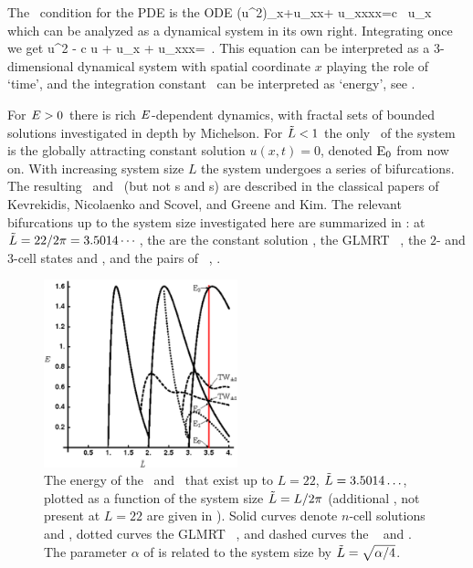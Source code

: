 The \reqv\ condition for the {\KS} PDE 
is the ODE
\beq
{\textstyle{}}(u^2)_x+u_{xx}+ u_{xxxx}=c \, u_x
which can be analyzed as a dynamical system in its own right.
Integrating once we get
\beq
{\textstyle{}}u^2 - c u + u_x + u_{xxx}=\expctE
\,.
\label{eq:stdks}
\eeq
This equation can be interpreted as a 3-dimen\-si\-on\-al dynamical system
with spatial coordinate $x$ playing the role of `time',
and the integration constant \expctE\ can be interpreted as `energy',
see .

For $E>0$ there is rich
$E$-dependent dynamics, with
fractal sets of bounded solutions investigated in
depth by Michelson.
For $\tilde{L}<1$ the only \eqv\ of the system is the
globally attracting constant
solution $u(x,t)=0$, denoted $\mathrm{E}_{0}$ from now on. With increasing system size $L$ the system
undergoes a series of bifurcations.
The resulting \eqva\ and
\reqva\ (but not \po s and \rpo s)
are described in the classical papers of
Kevrekidis, Nicolaenko and Scovel,
and Greene and Kim.
The relevant bifurcations
up to the system size
investigated here are summarized
in :
at $\tilde{L}=22/2\pi =
3.5014\cdots$, the {\eqva} are the constant solution
, the GLMRT \eqv\ , the $2$-
and $3$-cell states  and ,
and the pairs of \reqva\ , .

\begin{figure}[t]       \label{fig:ksBifDiag}
\begin{center}
\includegraphics[width=0.5\textwidth]{figs_bmp/ksBifDiag_pst.eps}
\end{center}
\caption{
The energy  of the \eqva\ and \reqva\ that
exist up to $L=22$, $\tilde{L} = 3.5014\ldots$, plotted as a function
of the system size $\tilde{L} = L/2\pi$ (additional \eqva, not present
at $L = 22$ are given in ). Solid curves denote
$n$-cell solutions  and , dotted curves the GLMRT
\eqv\ ,
and dashed curves the \reqva\  and .
The parameter $\alpha$ of  is
related to the system size by $\tilde{L}=\sqrt{\alpha/4}$.
        }
\end{figure}

